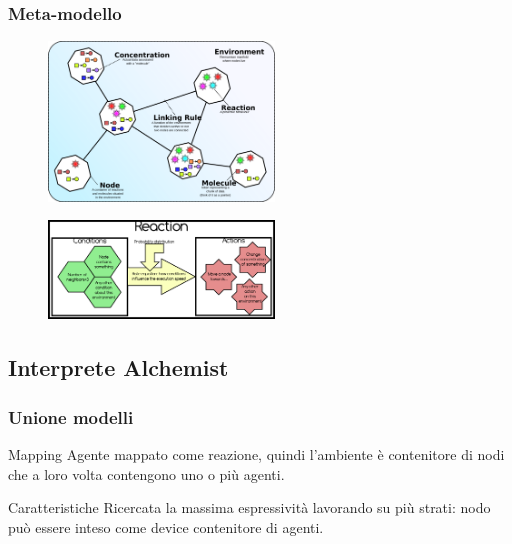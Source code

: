 \documentclass[handout]{beamer}\mode<presentation>{\usetheme{AMSCesenaBleu}}
\begin{document}
\begin{frame}
\frametitle{Meta-modello}
\begin{figure}
\includegraphics[width=6cm]{images/alchemistModel.png}
\end{figure}
\begin{figure}
\includegraphics[width=6cm]{images/alchemistReaction.png}
\end{figure}
\end{frame}


\subsection{Interprete Alchemist}
\begin{frame}
\frametitle{Unione modelli}
\begin{block}{Mapping}
Agente mappato come reazione, quindi l'ambiente è contenitore di nodi che a loro volta contengono uno o più agenti.
\end{block}
\begin{block}{Caratteristiche}
Ricercata la massima espressività lavorando su più strati: nodo può essere inteso come device contenitore di agenti.
\end{block}
\end{frame}

\section{}
\subsection{}
\maketitle
\end{document}
